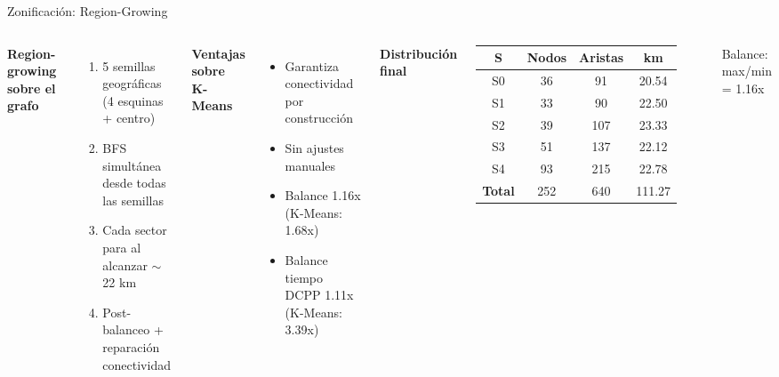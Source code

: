 \documentclass[11pt,aspectratio=169]{beamer}
\begin{document}
\begin{frame}{Zonificación: Region-Growing}
\begin{columns}[T]
\textbf{Region-growing sobre el grafo}
\begin{enumerate}
  \item 5 semillas geográficas (4 esquinas + centro)
  \item BFS simultánea desde todas las semillas
  \item Cada sector para al alcanzar $\sim$22 km
  \item Post-balanceo + reparación conectividad
\end{enumerate}

\vspace{8pt}
\textbf{Ventajas sobre K-Means}
\begin{itemize}
  \item Garantiza conectividad por construcción
  \item Sin ajustes manuales
  \item Balance 1.16x (K-Means: 1.68x)
  \item Balance tiempo DCPP 1.11x (K-Means: 3.39x)
\end{itemize}

\centering
\textbf{Distribución final}\\[4pt]
\begin{tabular}{cccc}
\toprule
\textbf{S} & \textbf{Nodos} & \textbf{Aristas} & \textbf{km}\\
\midrule
\rowcolor{myred!15}    S0 & 36 & 91  & 20.54\\
\rowcolor{myblue!15}   S1 & 33 & 90  & 22.50\\
\rowcolor{mygreen!15}  S2 & 39 & 107 & 23.33\\
\rowcolor{myorange!15} S3 & 51 & 137 & 22.12\\
\rowcolor{mypurple!15} S4 & 93 & 215 & 22.78\\
\midrule
\textbf{Total} & 252 & 640 & 111.27\\
\bottomrule
\end{tabular}

\vspace{6pt}
\tiny Balance: max/min = 1.16x
\end{columns}
\end{frame}
\end{document}
